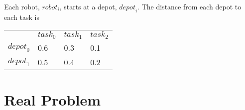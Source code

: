 \documentclass[a4paper]{article}
\begin{document}
Each robot, $\mathit{robot}_i$, starts at a depot, $\mathit{depot}_i$. The distance from each depot to each task is

\begin{tabular}{llll}
                   & $\mathit{task}_0$ & $\mathit{task}_1$ & $\mathit{task}_2$ \\
$\mathit{depot}_0$ & 0.6               & 0.3               & 0.1               \\
$\mathit{depot}_1$ & 0.5               & 0.4               & 0.2               \\
\end{tabular}
\vspace{1.5em}

\section{Real Problem}

\end{document}

